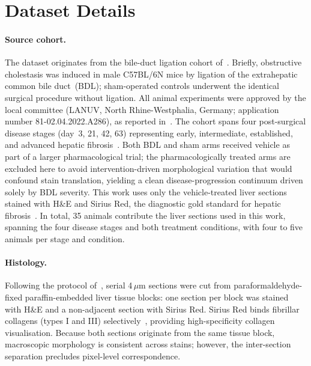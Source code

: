 
\section{Dataset Details}
\label{sec:supp-dataset}

\paragraph{Source cohort.}
\label{sec:supp-animal_model}

The dataset originates from the bile-duct ligation cohort
of~\cite{ghallab2025asbt}. Briefly, obstructive cholestasis was induced in male
C57BL/6N mice by ligation of the extrahepatic common bile duct~(BDL); sham-operated
controls underwent the identical surgical procedure without ligation. All animal
experiments were approved by the local committee (LANUV, North Rhine-Westphalia,
Germany; application number 81-02.04.2022.A286), as reported
in~\cite{ghallab2025asbt}. The cohort
spans four post-surgical disease stages (day~3, 21, 42, 63) representing early,
intermediate, established, and advanced hepatic fibrosis~\cite{bataller2005liver}.
Both BDL and sham arms received vehicle as part of a larger pharmacological trial;
the pharmacologically treated arms are excluded here to avoid intervention-driven
morphological variation that would confound stain translation, yielding a clean
disease-progression continuum driven solely by BDL severity.
This work uses only the vehicle-treated liver sections stained with H\&E and
Sirius Red, the diagnostic gold standard for hepatic
fibrosis~\cite{huang2013sirius}.
In total, 35 animals contribute the liver sections used in this work, spanning the
four disease stages and both treatment conditions, with four to five animals per
stage and condition.

\paragraph{Histology.}
\label{sec:supp-staining}

Following the protocol of~\cite{ghallab2025asbt}, serial 4\,$\mu$m sections were
cut from para\-form\-alde\-hyde-fixed paraffin-embedded liver tissue blocks: one section
per block was stained with H\&E and a non-adjacent section with Sirius Red.
Sirius Red binds fibrillar collagens (types I and III)
selectively~\cite{constantine1969}, providing high-specificity collagen
visualisation. Because both sections originate from the same tissue block,
macroscopic morphology is consistent across stains; however, the inter-section
separation precludes pixel-level correspondence.

